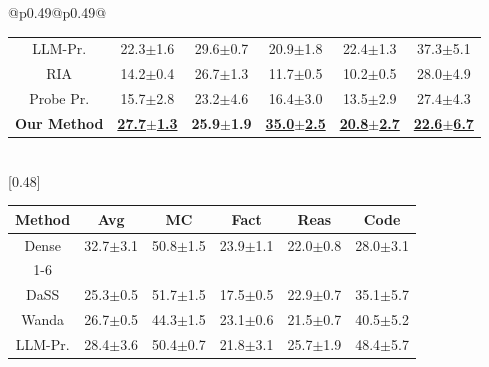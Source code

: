 \begin{table}[!t]
\begin{tabular}{@{}p{}@{}p{}@{}}
{\begin{tabular}{c c c c c c}
LLM-Pr. & 22.3{\scriptsize$\pm$1.6} & 29.6{\scriptsize$\pm$0.7} & 20.9{\scriptsize$\pm$1.8} & 22.4{\scriptsize$\pm$1.3} & 37.3{\scriptsize$\pm$5.1} \\
RIA & 14.2{\scriptsize$\pm$0.4} & 26.7{\scriptsize$\pm$1.3} & 11.7{\scriptsize$\pm$0.5} & 10.2{\scriptsize$\pm$0.5} & 28.0{\scriptsize$\pm$4.9} \\
Probe Pr. & 15.7{\scriptsize$\pm$2.8} & 23.2{\scriptsize$\pm$4.6} & 16.4{\scriptsize$\pm$3.0} & 13.5{\scriptsize$\pm$2.9} & 27.4{\scriptsize$\pm$4.3} \\
\rowcolor{icmlblue} \textbf{Our Method} & \textbf{\underline{27.7{\scriptsize$\pm$1.3}}} & \textbf{25.9{\scriptsize$\pm$1.9}} & \textbf{\underline{35.0{\scriptsize$\pm$2.5}}} & \textbf{\underline{20.8{\scriptsize$\pm$2.7}}} & \textbf{\underline{22.6{\scriptsize$\pm$6.7}}} \\
\bottomrule
\end{tabular}
} \\[0.5em]
[0.48\textwidth]{
\begin{tabular}{c c c c c c}
\toprule
\textbf{Method} & \textbf{Avg} & \textbf{MC} & \textbf{Fact} & \textbf{Reas} & \textbf{Code} \\
\midrule
\rowcolor{white} Dense & 32.7{\scriptsize$\pm$3.1} & 50.8{\scriptsize$\pm$1.5} & 23.9{\scriptsize$\pm$1.1} & 22.0{\scriptsize$\pm$0.8} & 28.0{\scriptsize$\pm$3.1} \\
\cmidrule(lr){1-6}
\rowcolor{lightgray} \multicolumn{6}{c}{\rule{0pt}{2.2ex}\textbf{Light Pruning}\rule[-0.8ex]{0pt}{0pt}} \\
DaSS & 25.3{\scriptsize$\pm$0.5} & 51.7{\scriptsize$\pm$1.5} & 17.5{\scriptsize$\pm$0.5} & 22.9{\scriptsize$\pm$0.7} & 35.1{\scriptsize$\pm$5.7} \\
Wanda & 26.7{\scriptsize$\pm$0.5} & 44.3{\scriptsize$\pm$1.5} & 23.1{\scriptsize$\pm$0.6} & 21.5{\scriptsize$\pm$0.7} & 40.5{\scriptsize$\pm$5.2} \\
LLM-Pr. & 28.4{\scriptsize$\pm$3.6} & 50.4{\scriptsize$\pm$0.7} & 21.8{\scriptsize$\pm$3.1} & 25.7{\scriptsize$\pm$1.9} & 48.4{\scriptsize$\pm$5.7} \\

\end{tabular}}
\end{tabular}
\end{table}
